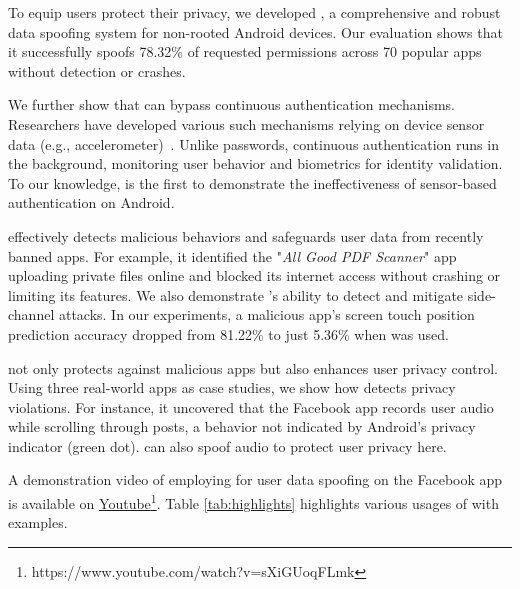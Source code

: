 To equip users protect their privacy, we developed \textit{\framework{}}, a comprehensive and robust data spoofing system for non-rooted Android devices. Our evaluation shows that it successfully spoofs 78.32\% of requested permissions across 70 popular apps without detection or crashes.

We further show that \framework{} can bypass continuous authentication mechanisms. Researchers have developed various such mechanisms relying on device sensor data (e.g., accelerometer)~\cite{kolokas2019gait,sun2018artificial,thang2012gait,hoang2013adaptive,shih2015flick,nohara2016personal,lu2015safeguard,jain2015exploring,nixon2016slowmo,feng2014tips,abuhamad2020autosen,amini2018deepauth,li2018using,yan2018towards,song2016eyeveri,xia2018motionhacker,hong2016mgra,hong2015waving,miguel2016interaction,zhang2016voicelive,wang2019voicepop,johnson2013secure,khamis2016gazetouchpass,zhu2013sensec,sitova2015hmog,pang2019mineauth,acien2019multilock,zhu2019riskcog,lee2017implicit}. Unlike passwords, continuous authentication runs in the background, monitoring user behavior and biometrics for identity validation. To our knowledge, \framework{} is the first to demonstrate the ineffectiveness of sensor-based authentication on Android.



\framework{} effectively detects malicious behaviors and safeguards user data from recently banned apps. For example, it identified the "\textit{All Good PDF Scanner}" app uploading private files online and blocked its internet access without crashing or limiting its features. We also demonstrate \framework{}'s ability to detect and mitigate side-channel attacks. In our experiments, a malicious app's screen touch position prediction accuracy dropped from 81.22\% to just 5.36\% when \framework{} was used.

\framework{} not only protects against malicious apps but also enhances user privacy control. Using three real-world apps as case studies, we show how \framework{} detects privacy violations. For instance, it uncovered that the Facebook app records user audio while scrolling through posts, a behavior not indicated by Android's privacy indicator (green dot). \framework{} can also spoof audio to protect user privacy here.

A demonstration video of employing \framework{} for user data spoofing on the Facebook app is available on \href{https://www.youtube.com/watch?v=sXiGUoqFLmk}{Youtube}\footnote{https://www.youtube.com/watch?v=sXiGUoqFLmk}. Table \ref{tab:highlights} highlights various usages of \framework{} with examples.

